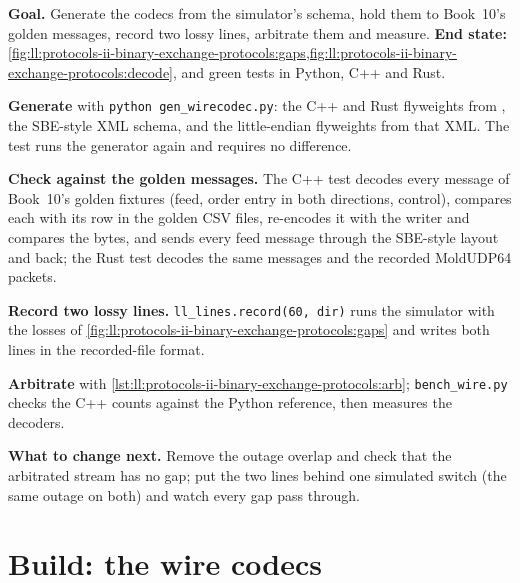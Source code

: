 \begin{tutorial}
\textbf{Goal.} Generate the codecs from the simulator's schema, hold them to Book~10's golden messages, record two lossy
lines, arbitrate them and measure. \textbf{End state:}
\cref{fig:ll:protocols-ii-binary-exchange-protocols:gaps,fig:ll:protocols-ii-binary-exchange-protocols:decode}, and green
tests in Python, C++ and Rust.
\begin{tutsteps}
\item \textbf{Generate} with \texttt{python gen\_wirecodec.py}: the C++ and Rust flyweights from
, the SBE-style XML schema, and the little-endian flyweights from that XML. The test runs
the generator again and requires no difference.
\item \textbf{Check against the golden messages.} The C++ test decodes every message of Book~10's golden fixtures (feed,
order entry in both directions, control), compares each with its row in the golden CSV files, re-encodes it with the writer
and compares the bytes, and sends every feed message through the SBE-style layout and back; the Rust test decodes the same
messages and the recorded MoldUDP64 packets.
\item \textbf{Record two lossy lines.} \texttt{ll\_lines.record(60, dir)} runs the simulator with the losses of
\cref{fig:ll:protocols-ii-binary-exchange-protocols:gaps} and writes both lines in the recorded-file format.
\item \textbf{Arbitrate} with \cref{lst:ll:protocols-ii-binary-exchange-protocols:arb}; \texttt{bench\_wire.py} checks the C++
counts against the Python reference, then measures the decoders.
\end{tutsteps}
\textbf{What to change next.} Remove the outage overlap and check that the arbitrated stream has no gap; put the two lines
behind one simulated switch (the same outage on both) and watch every gap pass through.
\end{tutorial}

\section{Build: the wire codecs}\label{bld:ll:protocols-ii-binary-exchange-protocols:wirecodec}

